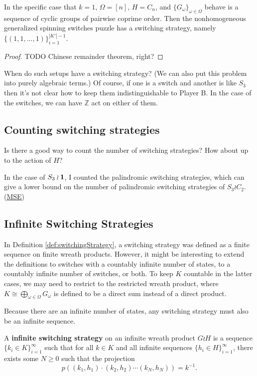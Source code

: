 \begin{proposition}
  In the specific case that $k=1$, $\Omega = [n]$, $H = C_n$, and
  $\{G_\omega\}_{\omega \in \Omega}$ behave is a sequence of cyclic groups of
  pairwise coprime order.
  Then the nonhomogeneous generalized spinning switches puzzle has a switching
  strategy, namely $\{(1,1,\dots,1)\}_{i = 1}^{|K'| - 1}$.
\end{proposition}

\begin{proof}
  TODO
  Chinese remainder theorem, right?
\end{proof}

When do such setups have a switching strategy?
(We can also put this problem into purely algebraic terms.)
Of course, if one is a switch and another is like $S_3$ then it's not clear how
to keep them indistinguishable to Player B. In the case of the switches,
we can have $\mathbb Z$ act on either of them.

\subsection{Counting switching strategies}
Is there a good way to count the number of switching strategies?
How about up to the action of $H$?

In the case of $S_3 \wr \bf{1}$, I counted the palindromic switching
strategies, which can give a lower bound on the number of palindromic
switching strategies of $S_3 \wr C_2$.
(\href{https://math.stackexchange.com/q/3717562/121988}{MSE})

\subsection{Infinite Switching Strategies} %
In Definition \ref{def:switchingStrategy}, a switching strategy was defined
as a finite sequence on finite wreath products. However, it might be interesting
to extend the definitions to switches with a countably infinite number of states,
to a countably infinite number of switches, or both.
To keep $K$ countable in the latter cases,
we may need to restrict to the restricted wreath product, where
$K \cong \bigoplus_{\omega \in \Omega} G_\omega$ is defined to be a direct
sum instead of a direct product.

Because there are an infinite number of states, any switching strategy must
also be an infinite sequence.
\begin{definition}
  A \textbf{infinite switching strategy} on an infinite wreath product $G \wr H$
  is a sequence $\{k_i \in K\}_{i=1}^\infty$ such that for all $k \in K$ and
  all infinite sequences ${\{h_i \in H\}_{i=1}^\infty}$,
  there exists some $N \geq 0$ such that the projection \[
    p((k_1, h_1)\cdot(k_2, h_2)\cdots(k_N, h_N)) = k^{-1}.
  \]
\end{definition}

